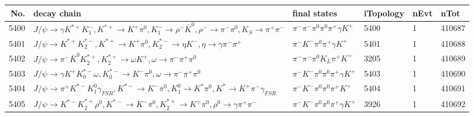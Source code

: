 \begin{table}[htbp] 
\begin{center}
\begin{small}
\begin{tabular}{rlllll}\hline\hline
 No. & decay chain & final states &  iTopology & nEvt & nTot \\\hline
5400&$J/\psi       \rightarrow \gamma       K^{*+}         K_{1}^{-}      , K^{*+}          \rightarrow K^{+}          \pi^{0}        , K_{1}^{-}       \rightarrow \rho^{-}      \bar{K}^{0}   , \rho^{-}       \rightarrow \pi^{-}        \pi^{0}        , K_{S}           \rightarrow \pi^{+}        \pi^{-}        $&$\pi^{-}        \pi^{-}        \pi^{0}        \pi^{0}        \pi^{+}        \gamma       K^{+}          $& 5400&    1&410687\\
5401&$J/\psi       \rightarrow K^{*+}         K_2^{*-}       , K^{*+}          \rightarrow K^{+}          \pi^{0}        , K_2^{*-}        \rightarrow \eta          K^{-}          , \eta           \rightarrow \gamma       \pi^{-}        \pi^{+}        $&$\pi^{-}        K^{-}          \pi^{0}        \pi^{+}        \gamma       K^{+}          $& 5401&    1&410688\\
5402&$J/\psi       \rightarrow \pi^{-}        \bar{K}^{0}   K_2^{*+}       , K_2^{*+}        \rightarrow \omega         K^{+}          , \omega          \rightarrow \pi^{-}        \pi^{+}        \pi^{0}        $&$\pi^{-}        \pi^{-}        \pi^{0}        K_{L}          \pi^{+}        K^{+}          $& 3205&    1&410689\\
5403&$J/\psi       \rightarrow \gamma       K^{+}          K_{0}^{*-}     \omega         , K_{0}^{*-}      \rightarrow K^{-}          \pi^{0}        , \omega          \rightarrow \pi^{-}        \pi^{+}        \pi^{0}        $&$\pi^{-}        K^{-}          \pi^{0}        \pi^{0}        \pi^{+}        \gamma       K^{+}          $& 5403&    1&410690\\
5404&$J/\psi       \rightarrow \pi^{+}        K^{*-}         K_1^{0}        \gamma_{FSR} , K^{*-}          \rightarrow K^{-}          \pi^{0}        , K_1^{0}         \rightarrow K^{*}          \pi^{0}        , K^{*}           \rightarrow K^{+}          \pi^{-}        \gamma_{FSR} $&$\pi^{-}        K^{-}          \pi^{0}        \pi^{0}        \pi^{+}        K^{+}          $& 5404&    1&410691\\
5405&$J/\psi       \rightarrow K^{*-}         K_2^{*+}       \rho^{0}      , K^{*-}          \rightarrow K^{-}          \pi^{0}        , K_2^{*+}        \rightarrow K^{+}          \pi^{0}        , \rho^{0}       \rightarrow \gamma       \pi^{+}        \pi^{-}        $&$\pi^{-}        K^{-}          \pi^{0}        \pi^{0}        \pi^{+}        \gamma       K^{+}          $& 3926&    1&410692\\

\end{tabular}
\end{small}
\end{center}
\end{table}
